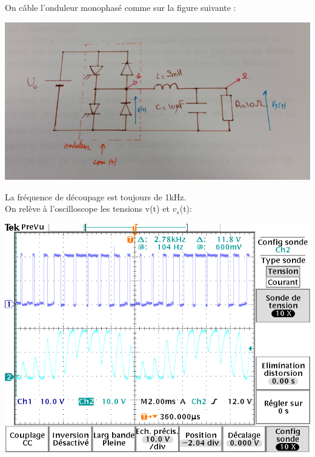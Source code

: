 \documentclass[10pt,a4paper]{article}
\begin{document}
	On câble l'onduleur monophasé comme sur la figure suivante :
	\begin{center}
	\includegraphics[scale=0.5]{schema1.png}
	\end{center}
	\noindent La fréquence de découpage est toujours de 1kHz.\\
	On relève à l'oscilloscope les tensions v(t) et $v_s$(t):
	\begin{center}
	\includegraphics[scale=0.4]{vvs.png}
	\end{center}
	
\end{document}
